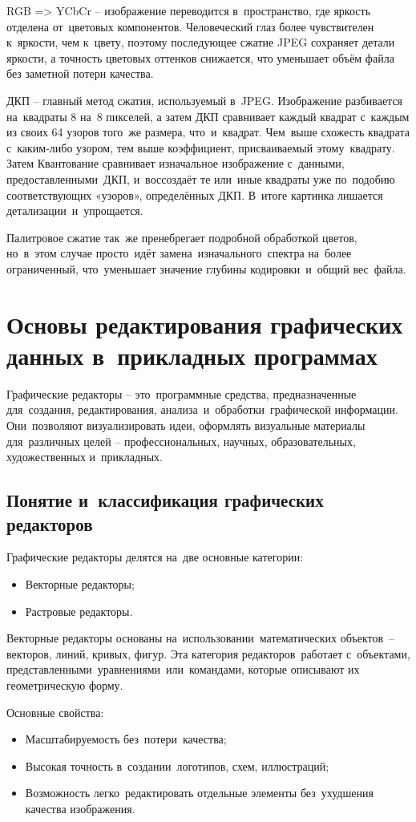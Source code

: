 \documentclass{ou}
\begin{document}
RGB => YCbCr -- изображение переводится в~пространство, где яркость отделена от~цветовых компонентов. Человеческий глаз более чувствителен к~яркости, чем к~цвету, поэтому последующее сжатие JPEG сохраняет детали яркости, а точность цветовых оттенков снижается, что уменьшает объём файла без заметной потери качества.

ДКП -- главный метод сжатия, используемый в~JPEG. Изображение разбивается на~квадраты 8 на~8 пикселей, а затем ДКП сравнивает каждый квадрат с~каждым из своих 64 узоров того~же размера, что~и~квадрат. Чем~выше схожесть квадрата с~каким-либо узором, тем выше коэффициент, присваиваемый этому~квадрату. Затем Квантование сравнивает изначальное изображение с~данными, предоставленными~ДКП, и~воссоздаёт те или~иные квадраты уже по~подобию соответствующих «узоров», определённых ДКП. В~итоге картинка лишается детализации~и~упрощается.

Палитровое сжатие так~же пренебрегает подробной обработкой цветов, но~в~этом случае просто~идёт замена~изначального~спектра на~более ограниченный, что~уменьшает значение глубины кодировки~и~общий вес~файла.
\newpage
\section{Основы редактирования графических данных в~прикладных программах}
Графические редакторы -- это~программные средства, предназначенные для~создания, редактирования, анализа~и~обработки~графической информации. Они~позволяют визуализировать идеи, оформлять визуальные материалы для~различных целей -- профессиональных, научных, образовательных, художественных и~прикладных. 
\subsection{Понятие и~классификация графических редакторов}
Графические редакторы делятся на~две основные категории:
\begin{itemize}[label=-, itemindent=2em, nosep]
  \item Векторные редакторы;
  \item Растровые редакторы.
\end{itemize}

Векторные редакторы основаны на~использовании~математических объектов~-- векторов, линий, кривых, фигур. Эта категория редакторов~работает с~объектами, представленными~уравнениями~или~командами, которые описывают их геометрическую форму. 

Основные свойства:
\begin{itemize}[label=-, itemindent=2em, nosep]
  \item Масштабируемость без~потери~качества;
  \item Высокая точность в~создании~логотипов, схем, иллюстраций;
  \item Возможность легко~редактировать отдельные элементы без~ухудшения качества изображения.
\end{itemize}
\end{document}
